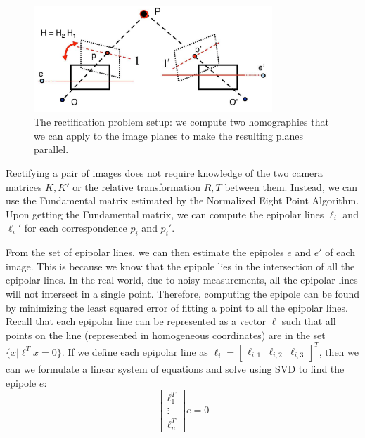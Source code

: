 \documentclass[a4paper, 12pt]{article}
\begin{document}
\begin{figure}[h!]
\centering
\includegraphics[width=0.8\textwidth]{figures/rectification_setup.jpg}
\caption{The rectification problem setup: we compute two homographies that we can apply to the image planes to make the resulting planes parallel.}
\label{fig:rectification_setup}
\end{figure}

Rectifying a pair of images does not require knowledge of the two camera matrices $K, K'$ or the relative transformation $R,T$ between them. Instead, we can use the Fundamental matrix estimated by the Normalized Eight Point Algorithm. Upon getting the Fundamental matrix, we can compute the epipolar lines $\ell_i$ and $\ell_i'$ for each correspondence $p_i$ and $p_i'$. 

From the set of epipolar lines, we can then estimate the epipoles $e$ and $e'$ of each image. This is because we know that the epipole lies in the intersection of all the epipolar lines. In the real world, due to noisy measurements, all the epipolar lines will not intersect in a single point. Therefore, computing the epipole can be found by minimizing the least squared error of fitting a point to all the epipolar lines. Recall that each epipolar line can be represented as a vector $\ell$ such that all points on the line (represented in homogeneous coordinates) are in the set $\{x | \ell^Tx = 0\}$. If we define each epipolar line as $\ell_i = \begin{bmatrix}\ell_{i,1} & \ell_{i,2} & \ell_{i,3} \end{bmatrix}^T$, then we can we formulate a linear system of equations and solve using SVD to find the epipole $e$:
\begin{equation} 
    \begin{bmatrix}
    \ell_{1}^T\\
    \vdots\\
    \ell_{n}^T
    \end{bmatrix}e = 0
\end{equation}
\end{document}
